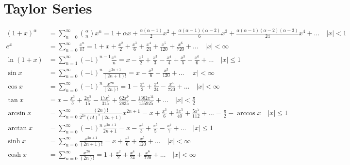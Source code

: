 \documentclass[]{article}
\newcommand{\abs}[1]{\left|#1\right|}
\begin{document}
    \section*{Taylor Series}
        
        \begin{align*}
            \left(1 + x\right)^\alpha &= \sum_{n = 0}^{\infty} \binom{\alpha}{n}x^n = 1 + \alpha x + \frac{\alpha\left(\alpha - 1\right)}{2} x^2 + \frac{\alpha\left(\alpha - 1\right)\left(\alpha - 2\right)}{6} x^3 + \frac{\alpha\left(\alpha - 1\right)\left(\alpha - 2\right)\left(\alpha - 3\right)}{24} x^4 + \ldots \quad \abs{x} < 1 \\
            e^x &= \sum_{n = 0}^{\infty} \frac{x^n}{n!} = 1 + x + \frac{x^2}{2} + \frac{x^3}{6} + \frac{x^4}{24} + \frac{x^5}{120} + \frac{x^6}{720} + \ldots \quad \abs{x} < \infty \\
            \ln{\left(1 + x\right)} &= \sum_{n = 1}^{\infty} \left(-1\right)^{n - 1} \frac{x^n}{n} = x - \frac{x^2}{2} + \frac{x^3}{3} - \frac{x^4}{4} + \frac{x^5}{5} - \frac{x^6}{6} + \ldots \quad \abs{x} \le 1 \\
            \sin{x} &= \sum_{n = 0}^{\infty} \left(-1\right)^n \frac{x^{2n + 1}}{\left(2n + 1\right)!} = x - \frac{x^3}{6} + \frac{x^5}{120} + \ldots \quad \abs{x} < \infty \\
            \cos{x} &= \sum_{n = 0}^{\infty} \left(-1\right)^n \frac{x^{2n}}{\left(2n\right)!} = 1 - \frac{x^2}{2} + \frac{x^4}{24} - \frac{x^6}{720} + \ldots \quad \abs{x} < \infty \\
            \tan{x} &= x - \frac{x^3}{3} + \frac{2x^5}{15} - \frac{17x^7}{315} + \frac{62x^9}{2835} - \frac{1382x^{11}}{155925} + \ldots \quad \abs{x} < \frac{\pi}{2} \\
            \arcsin{x} &= \sum_{n = 0}^{\infty} \frac{\left(2n\right)!}{2^{2n} \left(n!\right)^2 \left(2n + 1\right)}x^{2n + 1} = x + \frac{x^3}{6} + \frac{3x^5}{40} + \frac{5x^7}{112} + \ldots = \frac{\pi}{2} - \arccos{x} \quad \abs{x} \le 1 \\
            \arctan{x} &= \sum_{n = 0}^{\infty} \left(-1\right)^n \frac{x^{2n + 1}}{2n + 1} = x - \frac{x^3}{3} + \frac{x^5}{5} - \frac{x^7}{7} + \ldots \quad \abs{x} \le 1 \\
            \sinh{x} &= \sum_{n = 0}^{\infty} \frac{x^{2n + 1}}{\left(2n + 1\right)!} = x + \frac{x^3}{6} + \frac{x^5}{120} + \ldots \quad \abs{x} < \infty \\
            \cosh{x} &= \sum_{n = 0}^{\infty} \frac{x^{2n}}{\left(2n\right)!} = 1 + \frac{x^2}{2} + \frac{x^4}{24} + \frac{x^6}{720} + \ldots \quad \abs{x} < \infty \\

\end{align*}
\end{document}
